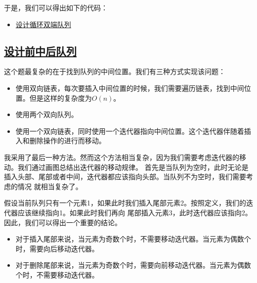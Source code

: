 \documentclass[../../main.tex]{subfiles}
\begin{document}
于是，我们可以得出如下的代码：



\begin{kaobox}[title=相关题目]
  \begin{itemize}
    \item \href{https://leetcode-cn.com/problems/design-circular-deque/}{设计循环双端队列}
  \end{itemize}
\end{kaobox}

\subsection{\href{https://leetcode.cn/problems/design-front-middle-back-queue/}{设计前中后队列}}

这个题最复杂的在于找到队列的中间位置。我们有三种方式实现该问题：

\begin{itemize}
  \item 使用双向链表，每次要插入中间位置的时候，我们需要遍历链表，找到中间位置。但是这样的复杂度为$O(n)$。
  \item 使用两个双向队列。
  \item 使用一个双向链表，同时使用一个迭代器指向中间位置。这个迭代器伴随着插入和删除操作的进行而移动。
\end{itemize}

我采用了最后一种方法。然而这个方法相当复杂，因为我们需要考虑迭代器的移动。我们通过画图总结出迭代器的移动规律。
首先是当队列为空时，此时无论是插入头部、尾部或者中间，迭代器都应该指向头部。当队列不为空时，我们需要考虑的情况
就相当复杂了。

假设当前队列只有一个元素1，如果此时我们插入尾部元素2。按照定义，我们的迭代器应该继续指向1。如果此时我们再向
尾部插入元素3，此时迭代器应该指向2。因此，我们可以得出一个重要的结论。

\begin{itemize}
  \item 对于插入尾部来说，当元素为奇数个时，不需要移动迭代器。当元素为偶数个时，需要向后移动迭代器。
  \item 对于删除尾部来说，当元素为奇数个时，需要向前移动迭代器。当元素为偶数个时，不需要移动迭代器。
\end{itemize}

\end{document}
